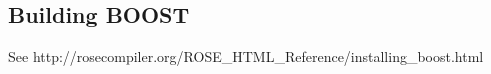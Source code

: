\subsection{Building BOOST}
\label{gettingStarted:BOOST}

See http://rosecompiler.org/ROSE\_HTML\_Reference/installing\_boost.html

